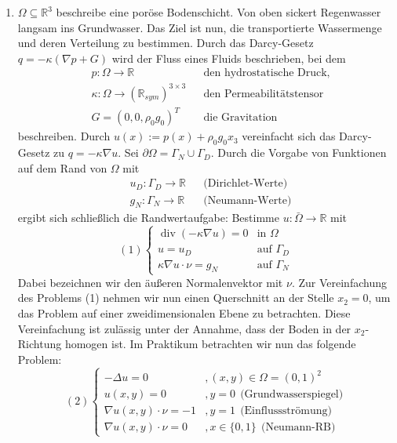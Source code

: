 \documentclass[12pt,a4paper]{scrartcl}
\newcommand{\R}{\mathbb{R}}
\DeclareMathOperator{\dive}{div}
\numberwithin{equation}{section}
\begin{document}
\begin{enumerate}[label=(\roman*)]
\item  $ \Omega \subseteq \R^3 $  beschreibe eine poröse Bodenschicht. Von oben sickert Regenwasser langsam ins Grundwasser. Das Ziel ist nun, die transportierte Wassermenge und deren Verteilung zu bestimmen.
\newline Durch das Darcy-Gesetz $ q= -\kappa(\nabla p + G)$ wird der Fluss eines Fluids beschrieben, bei dem 
\begin{align*}& p:\Omega \rightarrow \R &&\text{den hydrostatische Druck,}\\
&  \kappa : \Omega \rightarrow (\R_{sym})^{3\times3}  &&\text{den Permeabilitätstensor}\\
& G = (0,0,\rho_0 g_0)^T &&\text{die Gravitation}
\end{align*} beschreiben. Durch $u(x):=p(x)+\rho_0 g_0 x_3$ vereinfacht sich das Darcy-Gesetz zu $q=-\kappa\nabla u$.
\newline Sei $\partial \Omega = \Gamma_N \cup \Gamma_D$. Durch die Vorgabe von Funktionen auf dem Rand von $\Omega$ mit
\begin{align*}&u_D: \Gamma_D \rightarrow \R &&\text{(Dirichlet-Werte)}\\
& g_N: \Gamma_N \rightarrow \R &&\text{(Neumann-Werte)}
\end{align*} ergibt sich schließlich die Randwertaufgabe: Bestimme $u:\bar{\Omega} \rightarrow \R$ mit
\[(1)\begin{cases}
\dive (- \kappa \nabla u) = 0 &\text{in $\Omega$}\\
u = u_D  &\text{auf $\Gamma_D$}\\
\kappa \nabla u \cdot \nu = g_N &\text{auf $\Gamma_N$}
\end{cases}
\]
Dabei bezeichnen wir den äußeren Normalenvektor mit $\nu$.
\newline Zur Vereinfachung des Problems (1) nehmen wir nun einen Querschnitt an der Stelle $x_2 = 0$, um das Problem auf einer zweidimensionalen Ebene zu betrachten. Diese Vereinfachung ist zulässig unter der Annahme, dass der Boden in der $x_2$-Richtung homogen ist. 
\newline Im Praktikum betrachten wir nun das folgende Problem:
\[(2)\begin{cases}
- \Delta u = 0 &,(x,y) \in \Omega = (0,1)^2\\
u(x,y) =0   &,y=0 \ \ \text{(Grundwasserspiegel)}\\
\nabla u(x,y) \cdot \nu = -1 &,y=1 \ \ \text{(Einflussströmung)}\\
\nabla u(x,y) \cdot \nu = 0 &,x\in \{0,1\}  \ \ \text{(Neumann-RB)}
\end{cases}
\]


\end{enumerate}
\end{document}

